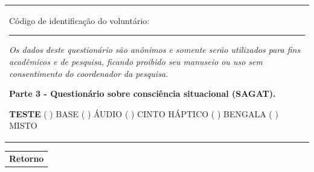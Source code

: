 \begin{table}[!htb]
    \centering
    \begin{tabular}{m{1\linewidth}}

        {\color{gray}
        
        Código de identificação do voluntário: \rule{1in}{.2mm}
        
        \textit{Os dados deste questionário são anônimos e somente serão utilizados para fins acadêmicos e de pesquisa, ficando proibido seu manuseio ou uso sem consentimento do coordenador da pesquisa.}
        }
        
        \begin{center}
        \textbf{Parte 3 - Questionário sobre consciência situacional (SAGAT).}
        \end{center}
        
        \noindent
        \textbf{TESTE} ( ) BASE \hfill ( ) ÁUDIO \hfill ( ) CINTO HÁPTICO \hfill ( ) BENGALA \hfill ( ) MISTO
        
    \end{tabular}

    \centering
    \begin{tabular}{m{1\linewidth}}
        \textbf{Retorno}
    \end{tabular}

\hspace{0.5cm}

%


\end{table}
